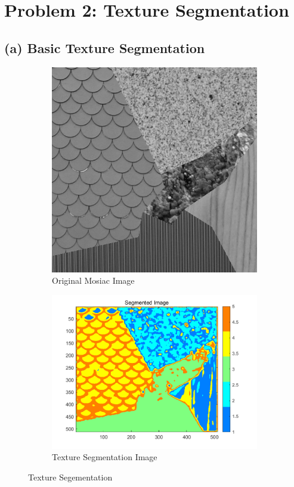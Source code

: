 \documentclass[12pt]{article}
\begin{document}
	\section*{Problem 2: Texture Segmentation}
		\subsection*{(a) Basic Texture Segmentation}
		\begin{figure}[H]
			\centering 
			\begin{subfigure}{0.4\textwidth}
				\centering
				\includegraphics[width=\textwidth]{composite.png}
				\caption{Original Mosiac Image}
				\label{fig:originalmosaic}
			\end{subfigure}
			\hfill
			\begin{subfigure}{0.55\textwidth}
				\centering
				\includegraphics[width=\textwidth]{segmented_image_a.png}
				\caption{Texture Segmentation Image}
				\label{fig:segmentaion}
			\end{subfigure}
			\caption{Texture Segementation}
			\label{p1.1}
		\end{figure}
\end{document}
